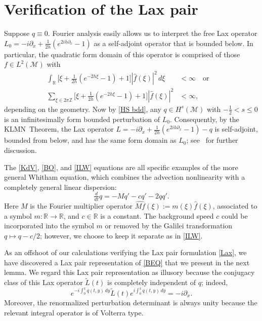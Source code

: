 \documentclass{amsart}
\newcommand{\R}{{\mathbb{R}}}
\newcommand{\Z}{{\mathbb{Z}}}
\newcommand{\qtq}[1]{\quad\text{#1}\quad}
\theoremstyle{definition}
\theoremstyle{remark}
\begin{document}
\section{Verification of the Lax pair}\label{S:LP}

Suppose $q\equiv 0$. Fourier analysis easily allows us to interpret the free Lax operator $L_0= -i\partial_x +\frac1{2h}(e^{2ih\partial_x}-1)$ as a self-adjoint operator that is bounded below.  In particular, the quadratic form domain of this operator is comprised of those $f\in L^2(\mathcal M)$ with 
\begin{equation}\label{Q(L0)}\begin{aligned}
\int_\R \bigl[\xi+ \tfrac1{2h}(e^{-2h\xi}-1) + 1\bigr] |\widehat f(\xi)|^2\,d\xi &< \infty \qtq{or}\\
\sum_{\xi\in2\pi\Z}  \bigl[\xi+ \tfrac1{2h}(e^{-2h\xi}-1) + 1\bigr] |\widehat f(\xi)|^2 &< \infty,
\end{aligned}\end{equation}
depending on the geometry.  Now by \eqref{HS bdd}, any $q\in H^s(\mathcal M)$ with $-\frac12<s\leq 0$ is an infinitesimally form bounded perturbation of $L_0$.  Consequently, by the KLMN~Theorem, the Lax operator $L= -i\partial_x +\frac1{2h}(e^{2ih\partial_x}-1)-q$ is self-adjoint, bounded from below, and has the same form domain as $L_0$; see~\cite{MR0493420} for further discussion.

The \eqref{KdV}, \eqref{BO}, and \eqref{ILW} equations are all specific examples of the more general Whitham equation, which combines the advection nonlinearity with a completely general linear dispersion:
\begin{equation}\label{BEQ}
\tfrac{d}{dt}q = - M q' - c q' - 2qq' .
\end{equation}
Here $M$ is the Fourier multiplier operator $\widehat{M f}(\xi) := m(\xi) \widehat f(\xi)$, associated to a symbol $m:\R\to\R$, and $c\in\R$ is a constant.  The background speed $c$ could be incorporated into the symbol $m$ or removed by the Galilei transformation $q\mapsto q -c/2$; however, we choose to keep it separate as in \eqref{ILW}.

As an offshoot of our calculations verifying the Lax pair formulation \eqref{Lax}, we have discovered a Lax pair representation of \eqref{BEQ} that we present in the next lemma.  We regard this Lax pair representation as illusory because the conjugacy class of this Lax operator \(\widetilde L(t)\) is completely independent of $q$; indeed,
\[
e^{-i\int_0^x q(t,y)\,dy}\widetilde L(t)e^{i\int_0^x q(t,y)\,dy} = -i\partial_x.
\]
Moreover, the renormalized perturbation determinant is always unity because the relevant integral operator is of Volterra type.
\end{document}
